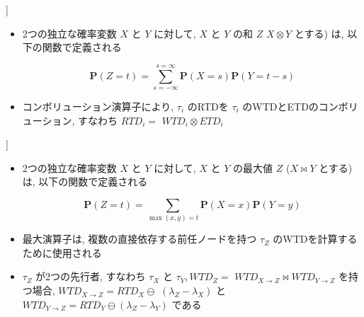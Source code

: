 \begin{frame}{}
    \begin{definition}[コンボリューション [4]]
        \setlength{\linewidth}{0.98\columnwidth}
        \begin{itemize}
            \item 2つの独立な確率変数 $X$ と $Y$ に対して, $X$ と $Y$ の和 $Z$ $X \otimes Y$ とする) は, 以下の関数で定義される

                  \begin{equation*}
                      \mathbf{P}(Z=t)=\sum_{s=-\infty}^{s=\infty} \mathbf{P}(X=s) \mathbf{P}(Y=t-s)
                  \end{equation*}

            \item コンボリューション演算子により, $\tau_{i}$ のRTDを $\tau_{i}$ のWTDとETDのコンボリューション, すなわち $R T D_{i}=$  $W T D_{i} \otimes E T D_{i}$
        \end{itemize}
    \end{definition}
\end{frame}

\begin{frame}{}
    \begin{definition}[最大値[4]]
        \setlength{\linewidth}{0.98\columnwidth}
        \begin{itemize}
            \item 2つの独立な確率変数 $X$ と $Y$ に対して, $X$ と $Y$ の最大値 $Z$ ($X \bowtie Y$ とする) は, 以下の関数で定義される

                  \begin{equation*}
                      \mathbf{P}(Z=t)=\sum_{\max (x, y)=t} \mathbf{P}(X=x) \mathbf{P}(Y=y)
                  \end{equation*}

            \item 最大演算子は, 複数の直接依存する前任ノードを持つ $\tau_{Z}$ のWTDを計算するために使用される
\item $\tau_{Z}$ が2つの先行者, すなわち $\tau_{X}$ と $\tau_{Y}, W T D_{Z}=$  $W T D_{X \rightarrow Z} \bowtie W T D_{Y \rightarrow Z}$ を持つ場合, $W T D_{X \rightarrow Z}=R T D_{X} \ominus$  $\left(\lambda_{Z}-\lambda_{X}\right)$ と $W T D_{Y \rightarrow Z}=R T D_{Y} \ominus\left(\lambda_{Z}-\lambda_{Y}\right)$ である
        \end{itemize}
    \end{definition}
\end{frame}

